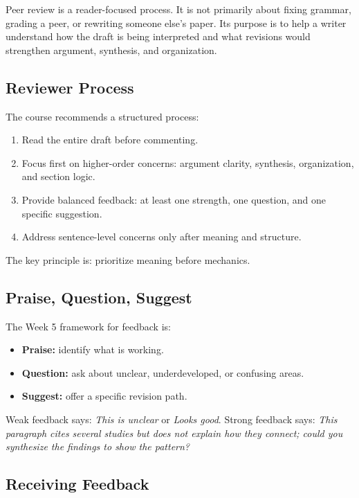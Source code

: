 \documentclass[10pt,letterpaper]{article}
\begin{document}
Peer review is a reader-focused process. It is not primarily about fixing grammar, grading a peer, or rewriting someone else's paper. Its purpose is to help a writer understand how the draft is being interpreted and what revisions would strengthen argument, synthesis, and organization.

\subsection{Reviewer Process}

The course recommends a structured process:

\begin{enumerate}
\item Read the entire draft before commenting.
\item Focus first on higher-order concerns: argument clarity, synthesis, organization, and section logic.
\item Provide balanced feedback: at least one strength, one question, and one specific suggestion.
\item Address sentence-level concerns only after meaning and structure.
\end{enumerate}

The key principle is: prioritize meaning before mechanics.

\subsection{Praise, Question, Suggest}

The Week 5 framework for feedback is:

\begin{itemize}
\item \textbf{Praise:} identify what is working.
\item \textbf{Question:} ask about unclear, underdeveloped, or confusing areas.
\item \textbf{Suggest:} offer a specific revision path.
\end{itemize}

Weak feedback says: \emph{This is unclear} or \emph{Looks good}. Strong feedback says: \emph{This paragraph cites several studies but does not explain how they connect; could you synthesize the findings to show the pattern?}

\subsection{Receiving Feedback}
\end{document}
